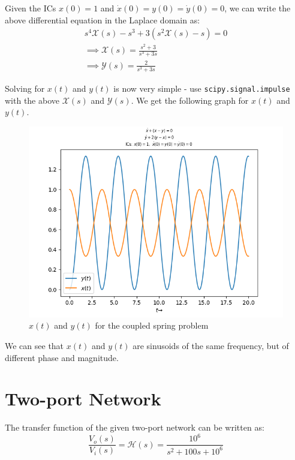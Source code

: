 \documentclass[11pt, a4paper, twoside]{article}
\begin{document}
    Given the ICs $x(0)=1$ and $\dot{x}(0)=y(0)=\dot{y}(0)=0$, we can write the above differential equation in the Laplace domain as:
    \begin{gather*}
        s^4\mathcal{X}(s)-s^3 + 3(s^2\mathcal{X}(s)-s)=0\\
        \implies \mathcal{X}(s) = \frac{s^2+3}{s^3+3s}\\
        \implies \mathcal{Y}(s) = \frac{2}{s^3+3s}
    \end{gather*}

    Solving for $x(t)$ and $y(t)$ is now very simple - use \texttt{scipy.signal.impulse} with the above $\mathcal{X}(s)$ and $\mathcal{Y}(s)$. We get the following graph for $x(t)$ and $y(t)$.
    \begin{figure}[H]
        \centering
        \includegraphics[scale=0.7]{Fig 4.png}
        \caption{$x(t)$ and $y(t)$ for the coupled spring problem}
        \label{fig:Fig4}
    \end{figure}

    We can see that $x(t)$ and $y(t)$ are sinusoids of the same frequency, but of different phase and magnitude.
\section{Two-port Network}
    The transfer function of the given two-port network can be written as:
    \begin{equation*}
        \frac{V_o(s)}{V_i(s)} = \mathcal{H}(s) = \frac{10^6}{s^2+100s+10^6}
    \end{equation*}
\end{document}
